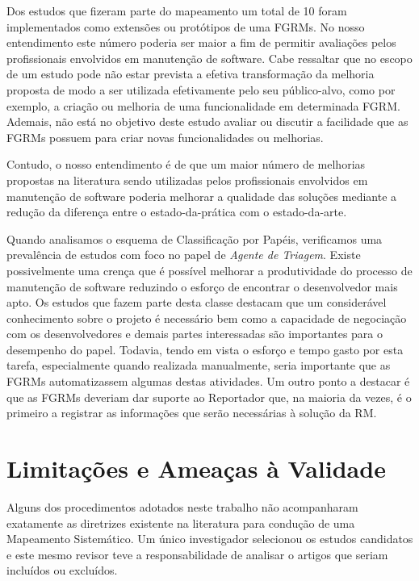 Dos estudos que fizeram parte do mapeamento um total de 10 foram implementados
como extensões ou protótipos de uma FGRMs. No nosso entendimento este número
poderia ser maior a fim de permitir avaliações pelos profissionais envolvidos em
manutenção de software. Cabe ressaltar que no escopo de um estudo pode não estar
prevista a efetiva transformação da melhoria proposta de modo a ser utilizada
efetivamente pelo seu público-alvo, como por exemplo, a criação ou melhoria de
uma funcionalidade em determinada FGRM\@. Ademais, não está no objetivo deste
estudo avaliar ou discutir a facilidade que as FGRMs possuem para criar novas
funcionalidades ou melhorias.

Contudo, o nosso entendimento é de que um maior número de melhorias propostas na
literatura sendo utilizadas pelos profissionais envolvidos em manutenção de
software poderia melhorar a qualidade das soluções mediante a redução da
diferença entre o estado-da-prática com o estado-da-arte.

Quando analisamos o esquema de Classificação por Papéis, verificamos uma
prevalência de estudos com foco no papel de \textit{Agente de Triagem}. Existe
possivelmente uma crença que é possível melhorar a produtividade do processo de
manutenção de software reduzindo o esforço de encontrar o desenvolvedor mais
apto. Os estudos que fazem parte desta classe destacam que um considerável
conhecimento sobre o projeto é necessário bem como a capacidade de negociação
com os desenvolvedores e demais partes interessadas são importantes para o
desempenho do papel. Todavia, tendo em vista o esforço e tempo gasto por esta
tarefa, especialmente quando realizada ma\-nu\-al\-men\-te, seria importante que
as FGRMs automatizassem algumas destas atividades. Um outro ponto a destacar é
que as FGRMs deveriam dar suporte ao Reportador que, na maioria da vezes, é o
primeiro a registrar as informações que serão necessárias à solução da RM\@.

\section{Limitações e Ameaças à Validade}
\label{sec:map_limitacoes_ameacas}

Alguns dos procedimentos adotados neste trabalho não acompanharam exatamente as
diretrizes existente na literatura para condução de uma Mapeamento Sistemático.
Um único investigador selecionou os estudos candidatos e este mesmo revisor teve
a responsabilidade de analisar o artigos que seriam incluídos ou excluídos.

